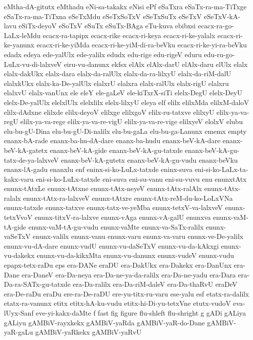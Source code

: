 {eMtha-dA-gitutx
eMthadu
eNi-sa-takakx
eNisi
ePf
eSaTxra
eSaTx-ra-ma-TiTxge
eSaTx-ra-ma-TiTxna
eSeTxMdu
eSeTxSoTxV
eSeTxSuTx
eSeTxV
eSeTxV-kA-lavu
eSiTx-deyoV
eSoTxV
eSuTx
eSuTx-BAga
eTu-kuva
ebibxsi
ecacx-ra-go-LaLx-leMdu
ecacx-ra-tapipx
ecacx-rike
ecacx-ri-keya
ecacx-ri-ke-yalalx
ecacx-ri-ke-yanunx
ecacx-ri-ke-yiMda
ecacx-ri-ke-yiM-di-ra-beVku
ecacx-ri-ke-yi-ra-beVku
edadx
edeya
ede-yalUlx
ede-yalilx
edudx
edu-rige
edu-rigeV
eduru
edu-ru-go-LuLx-vu-di-lalxveV
eiru-vu-danunx
ekfsx
elAlx
elAlx-darU
elAlx-daru
elUlx
elalx
elalx-dakUkx
elalx-dara
elalx-da-ralUlx
elalx-da-ra-lilxyU
elalx-da-riM-dalU
elalxkUkx
elalx-ka-De-yalUlx
elalxrU
elalxra
elalx-ralUlx
elalx-rigU
elalxru
elalxvU
elalx-vanUnx
ele
eleY
ele-gaLeV
ele-kiTxrX-siTi
elelx-DegU
elelx-DeyU
elelx-De-yalUlx
elelxlUlx
elelxlilx
elelx-lilxyU
eleya
elf
elilx
elilxMda
elilxM-daloV
elilx-dAdxne
elilxde
elilx-deyoV
elilxge
elilxgoV
elilx-ru-tatxve
elilxyU
elilx-ya-va-regU
elilx-ya-va-rege
elilx-ya-va-re-vigU
elilx-ya-va-re-vige
elilxyeV
elolxV
elubu
elu-bu-gU-Dina
elu-bu-gU-Di-nalilx
elu-bu-gaLa
elu-bu-ga-Lanunx
ememx
empty
enanx-bA-rade
enanx-ba-hu-dA-dare
enanx-ba-hudu
enanx-beV-kA-dare
enanx-beV-kA-gatetx
enanx-beV-kA-gide
enanx-beV-kA-gu-tatxde
enanx-beV-kA-gu-tatx-de-ya-lalxveV
enanx-beV-kA-gutetx
enanx-beV-kA-gu-vudu
enanx-beVku
enanx-lA-gadu
enanxlu
enf
eninx-si-ko-LuLx-tatxde
eninx-suva
eni-si-ko-LaLx-ta-kakx-varu
eni-si-ko-LuLx-tatxde
eni-suva
eni-su-vanu
eni-su-vuvu
enu
enunxtAtx
enunx-tAtxLe
enunx-tAtxne
enunx-tAtx-neyeV
enunx-tAtx-ralAlx
enunx-tAtx-ralalx
enunx-tAtx-ra-lalxveV
enunx-tAtxre
enunx-tAtx-reM-du-ko-LoLxVNa
enunx-tatxde
enunx-tatxve
enunx-tatx-ve-yeMba
enunx-tetxV-va-lalxveV
enunx-tetxVvoV
enunx-titxV-ra-lalxve
enunx-vAga
enunx-vA-galU
enunxva
enunx-vaM-tA-gide
enunx-vaM-tA-gu-vudu
enunx-vaMte
enunx-va-SaTx-ralilx
enunx-vaSeTxV
enunx-valilx
enunx-vanu
enunx-varu
enunx-va-varu
enunx-ve-De-yalilx
enunx-vu-dA-dare
enunx-vudU
enunx-vu-daSeTxV
enunx-vu-da-kAkxgi
enunx-vu-dakekx
enunx-vu-da-kikxMta
enunx-vu-danunx
enunx-vudeV
enunx-vudu
epapx-tetx-raDu
eps
era-DANe
eraDU
era-DakUkx
era-Dakekx
era-DanUnx
era-Dane
era-DaneV
era-Da-neya
era-Da-ne-ya-da-ralilx
era-Da-ne-yadu
era-Dara
era-Da-ra-SATx-gu-tatxde
era-Da-ralilx
era-Da-riM-daleV
era-Da-thaRvU
eraDeV
era-De-raDu
eraDu
ere-ra-De-raDU
ere-yu-titx-ru-varu
ese-yalu
esf
etatx-ra-dalilx
etatx-ra-vanunx
etitx
etitx-hA-ku-vudu
etitx-hi-Di-yu-tetxVne
etutx-vudoV
eva-lUyx-Sanf
eve-yi-kakx-daMte
f
fast
fig
figure
flu-shleft
flu-shright
g
gADi
gALiya
gALiyu
gAMBiV-rayxkekx
gAMBiV-yaRda
gAMBiV-yaR-do-Dane
gAMBiV-yaR-gaLu
gAMBiV-yaRkekx
gAMBiV-yaRvU
}
